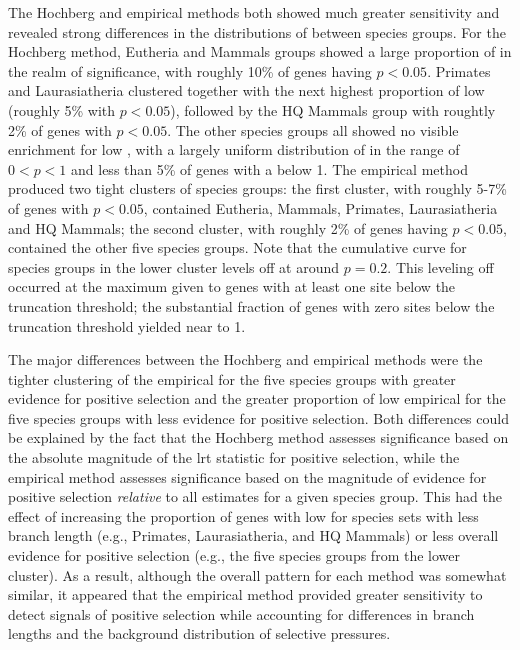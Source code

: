 The Hochberg and empirical methods both showed much greater
sensitivity and revealed strong differences in the distributions of
\pvs between species groups. For the Hochberg method, Eutheria and
Mammals groups showed a large proportion of \pvs in the realm of
significance, with roughly 10\% of genes having $p<0.05$. Primates and
Laurasiatheria clustered together with the next highest proportion of
low \pvs (roughly 5\% with $p<0.05$), followed by the HQ Mammals
group with roughtly 2\% of genes with $p<0.05$. The other species
groups all showed no visible enrichment for low \pvs, with a
largely uniform distribution of \pvs in the range of $0<p<1$ and
less than 5\% of genes with a \pv below 1. The empirical method
produced two tight clusters of species groups: the first cluster, with
roughly 5-7\% of genes with $p<0.05$, contained Eutheria, Mammals,
Primates, Laurasiatheria and HQ Mammals; the second cluster, with
roughly 2\% of genes having $p<0.05$, contained the other five species
groups. Note that the cumulative curve for species groups in the lower
cluster levels off at around $p=0.2$. This leveling off occurred at
the maximum \pv given to genes with at least one site below the
truncation threshold; the substantial fraction of genes with zero
sites below the truncation threshold yielded \pvs near to 1.

The major differences between the Hochberg and empirical methods were
the tighter clustering of the empirical \pvs for the five species
groups with greater evidence for positive selection and the greater
proportion of low empirical \pvs for the five species groups with less
evidence for positive selection. Both differences could be explained
by the fact that the Hochberg method assesses significance based on
the absolute magnitude of the \ac{lrt} statistic for positive
selection, while the empirical method assesses significance based on
the magnitude of evidence for positive selection \emph{relative} to
all \sw estimates for a given species group. This had the effect of
increasing the proportion of genes with low \pvs for species sets with
less branch length (e.g., Primates, Laurasiatheria, and HQ Mammals) or
less overall evidence for positive selection (e.g., the five species
groups from the lower cluster). As a result, although the overall
pattern for each method was somewhat similar, it appeared that the
empirical method provided greater sensitivity to detect signals of
positive selection while accounting for differences in branch lengths
and the background distribution of \sw selective pressures.

